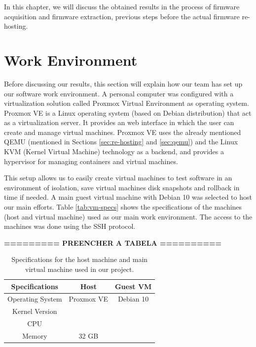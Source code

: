 In this chapter, we will discuss the obtained results in the process of firmware acquisition and firmware extraction, previous steps before the actual firmware re-hosting.

\section{Work Environment}

Before discussing our results, this section will explain how our team has set up our software work environment. A personal computer was configured with a virtualization solution called Proxmox Virtual Environment as operating system. Proxmox VE is a Linux operating system (based on Debian distribution) that act as a virtualization server. It provides an web interface in which the user can create and manage virtual machines. Proxmox VE uses the already mentioned QEMU \cite{qemu} (mentioned in Sections \ref{sec:re-hosting} and \ref{sec:qemu}) and the Linux KVM (Kernel Virtual Machine) technology as a backend, and provides a hypervisor for managing containers and virtual machines.

This setup allows us to easily create virtual machines to test software in an environment of isolation, save virtual machines disk snapshots and rollback in time if needed. A main guest virtual machine with Debian 10 was selected to host our main efforts. Table \ref{tab:vm-specs} shows the specifications of the machines (host and virtual machine) used as our main work environment. The access to the machines was done using the SSH protocol.

\textbf{========= PREENCHER A TABELA ========== }

\begin{table}[h]
\centering
\caption{Specifications for the host machine and main virtual machine used in our project.}
\begin{tabular}{ccc}
\hline
\textbf{Specifications} & \textbf{Host} & \textbf{Guest VM} \\ \hline
Operating System        & Proxmox VE    & Debian 10         \\
Kernel Version          &               &                   \\
CPU                     &               &                   \\
Memory                  & 32 GB         &                   \\ \hline
\end{tabular}
\label{tab:vm-spec}
\end{table}

